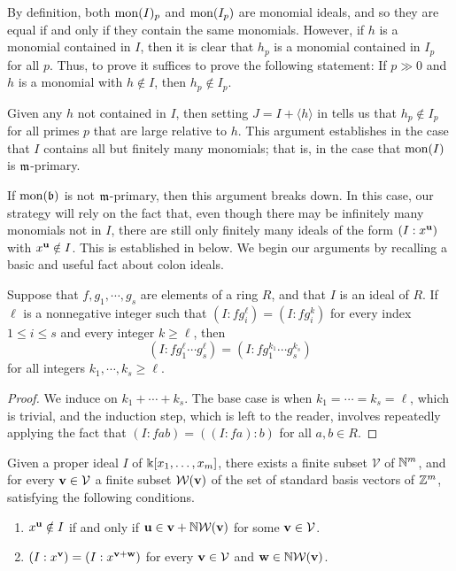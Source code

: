 \documentclass[11pt]{amsart}
\begin{document}
By definition, both $\operatorname{mon}(I)_p$ and $\operatorname{mon}(I_p)$ are monomial ideals, and so they are equal if and only if they contain the same monomials.  However, if $h$ is a monomial contained in $I$, then it is clear that $h_p$ is a monomial contained in $I_p$ for all $p$.  Thus, to prove  it suffices to prove the following statement:  If $p \gg 0$ and $h$ is a monomial with $h \notin I$, then $h_p \notin I_p$.

Given any $h$ not contained in $I$, then setting $J = I + \langle h \rangle$ in  tells us that $h_p \notin I_p$ for all primes $p$ that are large relative to $h$.  This argument establishes  in the case that $I$ contains all but finitely many monomials;  that is, in the case that $ \operatorname{mon}(I)$ is $\mathfrak{m}$-primary.

If $\operatorname{mon}(\mathfrak{b})$ is not $\mathfrak{m}$-primary, then this argument breaks down.  In this case, our strategy will rely on the fact that, even though there may be infinitely many monomials not in $I$, there are still only finitely many ideals of the form $(I:x^{\mathbf{u}})$ with $x^{\mathbf{u}} \notin I$.    This is established in  below.  We begin our arguments by recalling a basic and useful fact about colon ideals.




\begin{lemma}
\label{colon-product-stabilization: L}
  Suppose that $f,g_1, \cdots, g_s$ are elements of a ring $R$, and that $I$ is an ideal of $R$.
If $\ell$ is a nonnegative integer such that $(I: f g_i^\ell) = (I: f g_i^k)$ for every index $1 \leq i \leq s$ and every integer $k \geq \ell$, then \[ (I: f g_1^\ell \cdots g_s^\ell) = (I: f g_1^{k_1} \cdots g_s^{k_s})\] for all integers $k_1, \cdots, k_s \geq \ell$.
\end{lemma}

\begin{proof}
We induce on $k_1 + \cdots + k_s$.  The base case is when $k_1 = \cdots = k_s = \ell$, which is trivial, and the induction step, which is left to the reader, involves repeatedly applying the fact that $(I:fab) = ((I:fa):b)$ for all $a,b \in R$.
\end{proof}

\begin{lemma}
\label{monomial-noetherian-decomposition: L}
Given a proper ideal $I$ of $\Bbbk[x_1, \ldots, x_m]$, there exists a finite subset $\mathcal{V}$ of $\mathbb{N}^m$, and for every $\mathbf{v} \in \mathcal{V}$ a finite subset $\mathcal{W}(\mathbf{v})$ of the set of standard basis vectors of $\mathbb{Z}^m$,  satisfying the following conditions.
\begin{enumerate}
\item $x^{\mathbf{u}} \notin I$ if and only if $\mathbf{u} \in \mathbf{v} + \mathbb{N} \mathcal{W}(\mathbf{v})$ for some $\mathbf{v} \in \mathcal{V}$.
\item $(I:x^{\mathbf{v}}) = (I: x^{\mathbf{v}+\mathbf{w}})$ for every $\mathbf{v} \in \mathcal{V}$ and $\mathbf{w} \in  \mathbb{N}  \mathcal{W}(\mathbf{v})$.
\end{enumerate}
\end{lemma}
\end{document}
